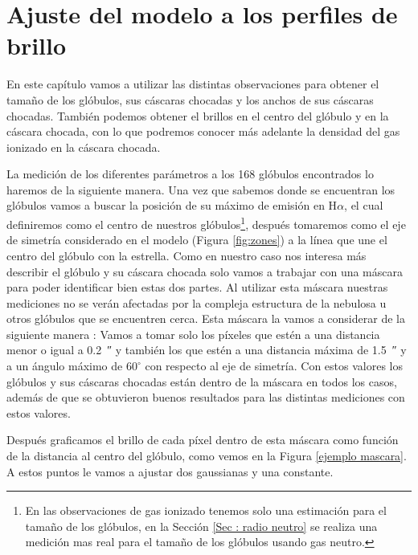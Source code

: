\documentclass{book}
\begin{document}
\chapter{Ajuste del modelo a los perfiles de
  brillo}\label{Chapter : Ajuste}

En este capítulo vamos a utilizar las distintas observaciones para
obtener el tamaño de los glóbulos, sus cáscaras chocadas y los anchos
de sus cáscaras chocadas. También podemos obtener el brillos en el
centro del glóbulo y en la cáscara chocada, con lo que podremos
conocer más adelante la densidad del gas ionizado en la cáscara
chocada.

La medición de los diferentes parámetros a los 168 glóbulos
encontrados lo haremos de la siguiente manera. Una vez que sabemos
donde se encuentran los glóbulos vamos a buscar la posición de su
máximo de emisión en H$\alpha$, el cual definiremos como el centro de
nuestros glóbulos\footnote{En las observaciones de gas ionizado
  tenemos solo una estimación para el tamaño de los glóbulos, en la
  Sección \ref{Sec : radio neutro} se realiza una medición mas real
  para el tamaño de los glóbulos usando gas neutro.}, después
tomaremos como el eje de simetría considerado en el modelo (Figura
\ref{fig:zones}) a la línea que une el centro del glóbulo con la
estrella. Como en nuestro caso nos interesa más describir el glóbulo y
su cáscara chocada solo vamos a trabajar con una máscara para poder
identificar bien estas dos partes. Al utilizar esta máscara nuestras
mediciones no se verán afectadas por la compleja estructura de la
nebulosa u otros glóbulos que se encuentren cerca. Esta máscara la
vamos a considerar de la siguiente manera : Vamos a tomar solo los
píxeles que estén a una distancia menor o igual a \SI{0.2}{\arcsecond}
y también los que estén a una distancia máxima de \SI{1.5}{\arcsecond}
y a un ángulo máximo de $60^\circ$ con respecto al eje de simetría. Con
estos valores los glóbulos y sus cáscaras chocadas están dentro de la
máscara en todos los casos, además de que se obtuvieron buenos
resultados para las distintas mediciones con estos valores.

Después graficamos el brillo de cada píxel dentro de esta máscara como
función de la distancia al centro del glóbulo, como vemos en la Figura
\ref{ejemplo mascara}. A estos puntos le vamos a ajustar dos
gaussianas y una constante.
\end{document}
